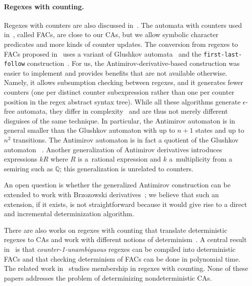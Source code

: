 \documentclass[acmsmall,screen]{acmart}
\begin{document}

 
\paragraph{Regexes with counting.}
 
Regexes with counters are also discussed
in~\cite{Hovland09,KilTuh07,GMN07}.
%
The automata with counters used in~\cite{Hovland09}, called FACs, are close to
our CAs, but we allow symbolic character predicates and more kinds of counter
updates.
%
The conversion from regexes to FACs proposed in~\cite{Hovland09} uses a variant
of Glushkov automata~\cite{Glu61} and the \texttt{first-last-follow}
construction~\cite{BP96,BW98}.
%
For us, the Antimirov-derivative-based construction was easier to implement and
provides benefits that are not available otherwise.
%
Namely, it allows subsumption checking between regexes,
%
and it generates fewer counters (one per distinct counter
subexpression rather than one per counter position in the regex abstract syntax
tree).
%
While all these algorithms generate $\epsilon$-free automata, they
differ in complexity~\cite{Allauzen06_unified} and are thus not merely
different disguises of the same technique.
%
In particular, the Antimirov automaton is in general smaller than the Glushkov
automaton with up to $n+1$ states and up to $n^2$ transitions.
%
The Antimirov automaton is in fact a quotient of the Glushkov
automaton 
~\cite{CZ01,IlieYu03}.
%
Another generalization of Antimirov derivatives
\cite{LOMBARDY2005141} introduces expressions $kR$ where $R$ is
a~rational expression and $k$ a~multiplicity from a semiring such as
$\mathbb{Q}$; this generalization is unrelated to counters.
 
An open question is whether the generalized Antimirov construction can be
extended to work with Brzozowski derivatives~\cite{Brzozowski64_derivatives}; we
believe that such an extension, if it exists, is not straightforward because it
would give rise to a direct and incremental determinization algorithm.
 
There are also works on regexes with counting that translate
deterministic regexes to CAs and work with different notions of
determinism~\cite{GGM12,Chen15_counting}.
%
A central result in~\cite{Hovland09} is that \emph{counter-1-unambiguous}
regexes can be compiled into deterministic FACs and that checking
determinism of FACs can be done in polynomial time.
%
The related work in~\cite{Hovland-Membership2012} studies membership in regexes
with counting.
%
None of these papers addresses the problem of determinizing nondeterministic
CAs.
 
\end{document}
